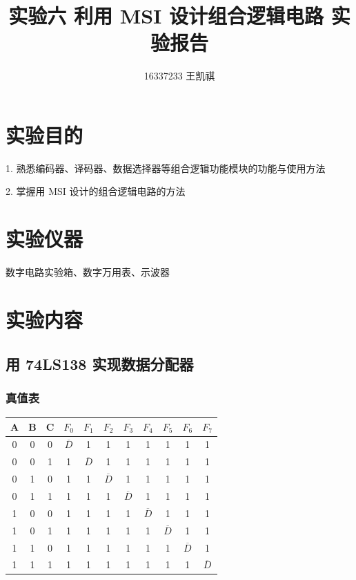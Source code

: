 \documentclass{article}
\begin{document}
\title{实验六 \text{ } 利用 MSI 设计组合逻辑电路 \text{ } 实验报告}
\author {16337233 王凯祺}
\maketitle

\section{实验目的}

1. 熟悉编码器、译码器、数据选择器等组合逻辑功能模块的功能与使用方法

2. 掌握用 MSI 设计的组合逻辑电路的方法

\section{实验仪器}

数字电路实验箱、数字万用表、示波器

\section{实验内容}

\subsection{用 74LS138 实现数据分配器}

\subsubsection{真值表}

\begin{table}[!hbp]
\centering
\begin{tabular}{|c|c|c||c|c|c|c|c|c|c|c|}
\hline
A & B & C & $F_0$ & $F_1$ & $F_2$ & $F_3$ & $F_4$ & $F_5$ & $F_6$ & $F_7$ \\
\hline
\hline
0 & 0 & 0 & $\overline{D}$ & 1 & 1 & 1 & 1 & 1 & 1 & 1 \\
\hline
0 & 0 & 1 & 1 & $\overline{D}$ & 1 & 1 & 1 & 1 & 1 & 1 \\
\hline
0 & 1 & 0 & 1 & 1 & $\overline{D}$ & 1 & 1 & 1 & 1 & 1 \\
\hline
0 & 1 & 1 & 1 & 1 & 1 & $\overline{D}$ & 1 & 1 & 1 & 1 \\
\hline
1 & 0 & 0 & 1 & 1 & 1 & 1 & $\overline{D}$ & 1 & 1 & 1 \\
\hline
1 & 0 & 1 & 1 & 1 & 1 & 1 & 1 & $\overline{D}$ & 1 & 1 \\
\hline
1 & 1 & 0 & 1 & 1 & 1 & 1 & 1 & 1 & $\overline{D}$ & 1 \\
\hline
1 & 1 & 1 & 1 & 1 & 1 & 1 & 1 & 1 & 1 & $\overline{D}$ \\
\hline


\end{tabular}
\end{table}
\end{document}
